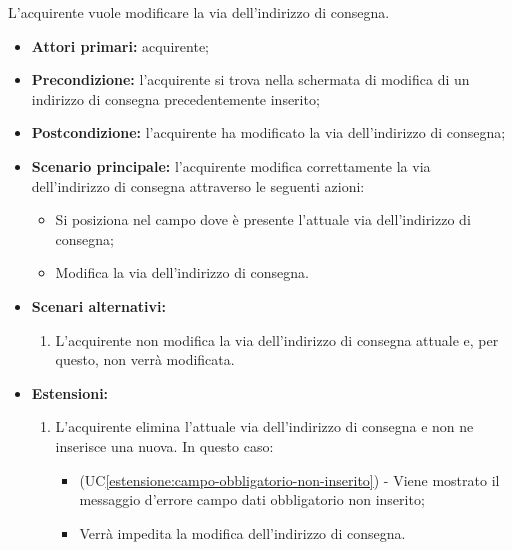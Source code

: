 \label{modifica-indirizzo-consegna.via}

L'acquirente vuole modificare la via dell'indirizzo di consegna.
\begin{itemize}
    \item \textbf{Attori primari:} acquirente;
    \item \textbf{Precondizione:} l'acquirente si trova nella schermata di modifica di un indirizzo di consegna precedentemente inserito;
    \item \textbf{Postcondizione:} l'acquirente ha modificato la via dell'indirizzo di consegna;
    \item \textbf{Scenario principale:} l'acquirente modifica correttamente la via dell'indirizzo di consegna attraverso le seguenti azioni:
    \begin{itemize}
        \item Si posiziona nel campo dove è presente l'attuale via dell'indirizzo di consegna;
        \item Modifica la via dell'indirizzo di consegna.
    \end{itemize}
    \item \textbf{Scenari alternativi:}
    \begin{enumerate}[label=\lett]
        \item L'acquirente non modifica la via dell'indirizzo di consegna attuale e, per questo, non verrà modificata.
    \end{enumerate}
    \item \textbf{Estensioni:}
    \begin{enumerate}[label=\lett]
        \item L'acquirente elimina l'attuale via dell'indirizzo di consegna e non ne inserisce una nuova. In questo caso:
        \begin{itemize}
            \item (UC\ref{estensione:campo-obbligatorio-non-inserito}) - Viene mostrato il messaggio d'errore campo dati obbligatorio non inserito;
            \item Verrà impedita la modifica dell'indirizzo di consegna.
        \end{itemize}
    \end{enumerate}
\end{itemize}

\label{modifica-indirizzo-consegna.cap}

